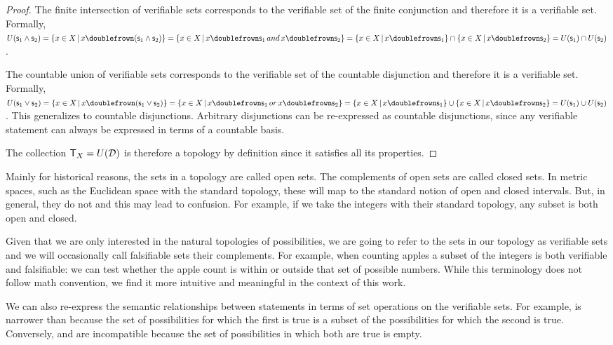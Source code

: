 \begin{mathSection}
\begin{proof}
			The finite intersection of verifiable sets corresponds to the verifiable set of the finite conjunction and therefore it is a verifiable set. Formally, $U(\stmt_1\AND\stmt_2) = \{ x \in X \, | \, x \comp (\stmt_1\AND\stmt_2)\} =  \{ x \in X \, | \, x \comp \stmt_1 \, and \, x \comp \stmt_2\} = \{ x \in X \, | \, x \comp \stmt_1\} \cap \{ x \in X \, | \, x \comp \stmt_2\} = U(\stmt_1) \cap U(\stmt_2)$.
			
			The countable union of verifiable sets corresponds to the verifiable set of the countable disjunction and therefore it is a verifiable set. Formally, $U(\stmt_1\OR\stmt_2) = \{ x \in X \, | \, x \comp (\stmt_1\OR\stmt_2)\} =  \{ x \in X \, | \, x \comp \stmt_1 \, or \, x \comp \stmt_2\} = \{ x \in X \, | \, x \comp \stmt_1\} \cup \{ x \in X \, | \, x \comp \stmt_2\} = U(\stmt_1) \cup U(\stmt_2)$. This generalizes to countable disjunctions. Arbitrary disjunctions can be re-expressed as countable disjunctions, since any verifiable statement can always be expressed in terms of a countable basis.
			
			The collection $\mathsf{T}_X=U(\mathcal{D})$ is therefore a topology by definition since it satisfies all its properties.
		\end{proof}
	\end{mathSection}
	
	Mainly for historical reasons, the sets in a topology are called open sets. The complements of open sets are called closed sets. In metric spaces, such as the Euclidean space with the standard topology, these will map to the standard notion of open and closed intervals. But, in general, they do not and this may lead to confusion. For example, if we take the integers with their standard topology, any subset is both open and closed.
	
	Given that we are only interested in the natural topologies of possibilities, we are going to refer to the sets in our topology as verifiable sets and we will occasionally call falsifiable sets their complements. For example, when counting apples a subset of the integers is both verifiable and falsifiable: we can test whether the apple count is within or outside that set of possible numbers. While this terminology does not follow math convention, we find it more intuitive and meaningful in the context of this work.
	
	We can also re-express the semantic relationships between statements in terms of set operations on the verifiable sets. For example,  is narrower than  because the set of possibilities for which the first is true is a subset of the possibilities for which the second is true. Conversely,  and  are incompatible because the set of possibilities in which both are true is empty.
	
